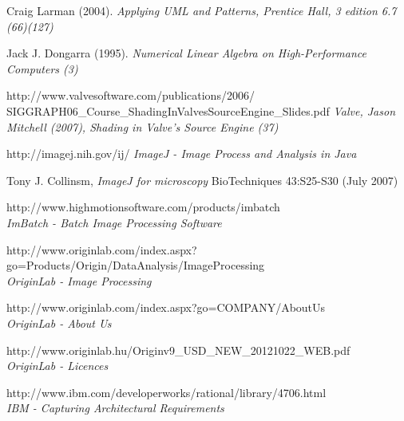 \documentclass[a4paper,12pt,oneside]{report}
\begin{document}
%
%

\begin{thebibliography}{99}

		Craig Larman (2004). 
        {\em Applying UML and Patterns, Prentice Hall, 3 edition 6.7 (66)(127)\\}

		Jack J. Dongarra (1995). 
        {\em Numerical Linear Algebra on High-Performance Computers (3)\\}
        
		http://www.valvesoftware.com/publications/2006/\\SIGGRAPH06\_Course\_ShadingInValvesSourceEngine\_Slides.pdf
        {\em Valve, Jason Mitchell (2007), Shading in Valve’s Source Engine  (37) \\}     
        
        

        http://imagej.nih.gov/ij/
        {\em ImageJ - Image Process and Analysis in Java}
        
		Tony J. Collinsm,
        {\em ImageJ for microscopy}
        BioTechniques 43:S25-S30 (July 2007)

        http://www.highmotionsoftware.com/products/imbatch\\
        {\em ImBatch - Batch Image Processing Software}

		http://www.originlab.com/index.aspx?go=Products/Origin/DataAnalysis/ImageProcessing\\
        {\em OriginLab - Image Processing}
        
        
        http://www.originlab.com/index.aspx?go=COMPANY/AboutUs\\
        {\em OriginLab - About Us}

		http://www.originlab.hu/Originv9\_USD\_NEW\_20121022\_WEB.pdf\\
        {\em OriginLab - Licences}
        
        http://www.ibm.com/developerworks/rational/library/4706.html\\
        {\em IBM - Capturing Architectural Requirements}  



\end{thebibliography}
\end{document}
